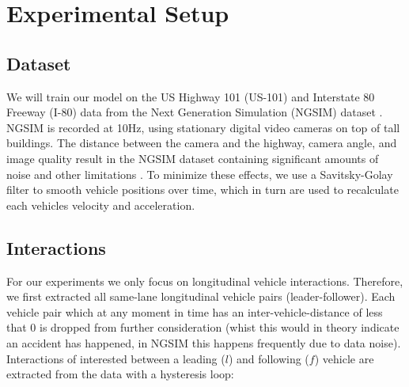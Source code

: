\section{Experimental Setup}
\label{sec:experimental_setup}

\subsection{Dataset}
\label{sec:experimental_setup_dataset}

We will train our model on the US Highway 101 (US-101) and Interstate 80 Freeway (I-80) data from the Next Generation Simulation (NGSIM) dataset \cite{colyar2007us,halkias2006ngsim}.
NGSIM is recorded at 10Hz, using stationary digital video cameras on top of tall buildings.
The distance between the camera and the highway, camera angle, and image quality result in the NGSIM dataset containing significant amounts of noise and other limitations \cite{punzo2011assessment,thiemann2008estimating}.
To minimize these effects, we use a Savitsky-Golay \cite{savitzky1964smoothing} filter to smooth vehicle positions over time, which in turn are used to recalculate each vehicles velocity and acceleration.

\subsection{Interactions}
\label{sec:experimental_setup_interactions}

For our experiments we only focus on longitudinal vehicle interactions.
Therefore, we first extracted all same-lane longitudinal vehicle pairs (leader-follower).
Each vehicle pair which at any moment in time has an inter-vehicle-distance of less that 0 is dropped from further consideration (whist this would in theory indicate an accident has happened, in NGSIM this happens frequently due to data noise).
Interactions of interested between a leading ($l$) and following ($f$) vehicle are extracted from the data with a hysteresis loop:

